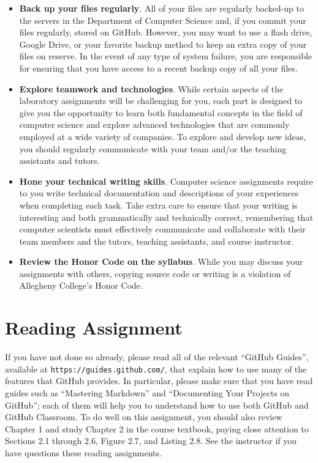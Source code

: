 \documentclass[11pt]{article}
\newcommand{\url}[1]{\lstinline{#1}}
\begin{document}
\begin{itemize}
\item {\bf Back up your files regularly}. All of your files are regularly backed-up to the servers in the Department of
  Computer Science and, if you commit your files regularly, stored on GitHub. However, you may want to use a flash
  drive, Google Drive, or your favorite backup method to keep an extra copy of your files on reserve. In the event of
  any type of system failure, you are responsible for ensuring that you have access to a recent backup copy of all your
  files.

\item {\bf Explore teamwork and technologies}. While certain aspects of the laboratory assignments will be challenging
  for you, each part is designed to give you the opportunity to learn both fundamental concepts in the field of computer
  science and explore advanced technologies that are commonly employed at a wide variety of companies. To explore and
  develop new ideas, you should regularly communicate with your team and/or the teaching assistants and tutors.

\item {\bf Hone your technical writing skills}. Computer science assignments require to you write technical
  documentation and descriptions of your experiences when completing each task. Take extra care to ensure that your
  writing is interesting and both grammatically and technically correct, remembering that computer scientists must
  effectively communicate and collaborate with their team members and the tutors, teaching assistants, and course
  instructor.

\item {\bf Review the Honor Code on the syllabus}. While you may discuss your assignments with others, copying source
  code or writing is a violation of Allegheny College's Honor Code.

\end{itemize}

\section*{Reading Assignment}

If you have not done so already, please read all of the relevant ``GitHub Guides'', available at
\url{https://guides.github.com/}, that explain how to use many of the features that GitHub provides. In particular,
please make sure that you have read guides such as ``Mastering Markdown'' and ``Documenting Your Projects on GitHub'';
each of them will help you to understand how to use both GitHub and GitHub Classroom. To do well on this assignment, you
should also review Chapter 1 and study Chapter 2 in the course textbook, paying close attention to Sections 2.1 through
2.6, Figure 2.7, and Listing 2.8. See the instructor if you have questions these reading assignments.
\end{document}
